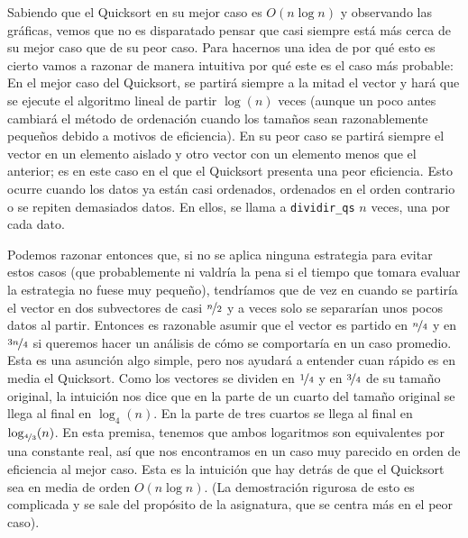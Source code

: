 \documentclass[12pt]{article}
\begin{document}
    Sabiendo que el Quicksort en su mejor caso es $O(n \log n)$ y observando las gráficas, vemos que no es disparatado pensar que casi siempre está más cerca de su mejor caso que de su peor caso. Para hacernos una idea de por qué esto es cierto vamos a razonar de manera intuitiva por qué este es el caso más probable: En el mejor caso del Quicksort, se partirá siempre a la mitad el vector y hará que se ejecute el algoritmo lineal de partir $\log(n)$ veces (aunque un poco antes cambiará el método de ordenación cuando los tamaños sean razonablemente pequeños debido a motivos de eficiencia). En su peor caso se partirá siempre el vector en un elemento aislado y otro vector con un elemento menos que el anterior; es en este caso en el que el Quicksort presenta una peor eficiencia. Esto ocurre cuando los datos ya están casi ordenados, ordenados en el orden contrario o se repiten demasiados datos. En ellos, se llama a \verb|dividir_qs| $n$ veces, una por cada dato.
    
    Podemos razonar entonces que, si no se aplica ninguna estrategia para evitar estos casos (que probablemente ni valdría la pena si el tiempo que tomara evaluar la estrategia no fuese muy pequeño), tendríamos que de vez en cuando se partiría el vector en dos subvectores de casi $\nicefrac{n}{2}$ y a veces solo se separarían unos pocos datos al partir. Entonces es razonable asumir que el vector es partido en $\nicefrac{n}{4}$ y en $\nicefrac{3n}{4}$ si queremos hacer un análisis de cómo se comportaría en un caso promedio. Esta es una asunción algo simple, pero nos ayudará a entender cuan rápido es en media el Quicksort. 
    Como los vectores se dividen en $\nicefrac{1}{4}$ y en $\nicefrac{3}{4}$ de su tamaño original, la intuición nos dice que en la parte de un cuarto del tamaño original se llega al final en $\log_4(n)$. En la parte de tres cuartos se llega al final en $\log_{\nicefrac{4}{3}}(n)$. En esta premisa, tenemos que ambos logaritmos son equivalentes por una constante real, así que nos encontramos en un caso muy parecido en orden de eficiencia al mejor caso. Esta es la intuición que hay detrás de que el Quicksort sea en media de orden $O(n \log n)$. (La demostración rigurosa de esto es complicada y se sale del propósito de la asignatura, que se centra más en el peor caso).
    
\end{document}

